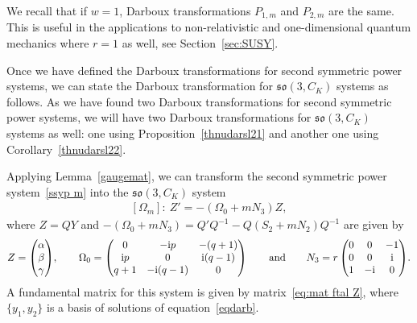 \documentclass[10pt,a4paper]{amsart}
\numberwithin{equation}{section}
\begin{document}
We recall that if $w=1$, Darboux transformations $P_{1,m}$ and $P_{2,m}$ are the same. This is useful in the applications to non-relativistic and one-dimensional quantum mechanics where $r=1$ as well, see Section~\ref{sec:SUSY}.

Once we have defined the Darboux transformations for second symmetric power systems, we can state the Darboux transformation for $\mathfrak{so}(3, C_K)$ systems as follows. As we have found two Darboux transformations for second symmetric power systems, we will have two Darboux transformations for $\mathfrak{so}(3, C_K)$ systems as well: one using Proposition~\ref{thnudarsl21} and another one using
Corollary~\ref{thnudarsl22}.

Applying Lemma~\ref{gaugemat}, we can transform the second symmetric power system~\eqref{ssyp m} into the $\mathfrak{so}(3, C_K)$ system
\begin{gather}\label{eq:system so3}
 [\Omega_m]\colon\ Z' = - (\Omega_0 + mN_3 ) Z,
\end{gather}
where $Z= Q Y$ and $- (\Omega_0 + mN_3 ) = Q' Q^{-1} - Q (S_2 + m N_2) Q^{-1} $ are given by
\begin{gather*}
Z= \begin{pmatrix}
	\alpha \\ \beta \\ \gamma \end{pmatrix}\!, \qquad
	\Omega_0=\begin{pmatrix}
	0&-{\rm i}p&-(q+1)\\ {\rm i}p&0&{\rm i}(q-1) \\ q+1&-{\rm i}(q-1)&0
	\end{pmatrix} \qquad \text{and} \qquad
	N_3 = r \begin{pmatrix} 0 & 0 & -1 \\ 0& 0& {\rm i} \\ 1 & -{\rm i} & 0 \end{pmatrix}\!.
\end{gather*}
A fundamental matrix for this system is given by matrix~\eqref{eq:mat ftal Z}, where $\{y_1, y_2\}$ is a basis of solutions of equation~\eqref{eqdarb}.
\end{document}
